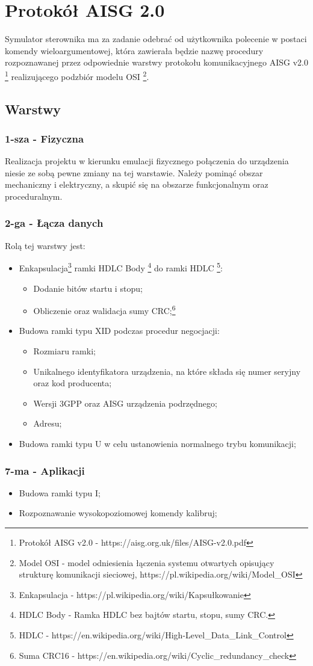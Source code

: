 \chapter{Protokół AISG 2.0}
	Symulator sterownika ma za zadanie odebrać od użytkownika polecenie w postaci komendy wieloargumentowej, 
	która zawierała będzie nazwę procedury rozpoznawanej przez odpowiednie warstwy protokołu komunikacyjnego AISG v2.0
	\footnote{\label{AISG} Protokół AISG v2.0 - https://aisg.org.uk/files/AISG-v2.0.pdf} realizującego podzbiór modelu OSI
	\footnote{\label{Model OSI} Model OSI - model odniesienia łączenia systemu otwartych opisujący strukturę komunikacji sieciowej, https://pl.wikipedia.org/wiki/Model\_OSI}. %
	\section{Warstwy}
		\subsection{1-sza - Fizyczna}
		Realizacja projektu w kierunku emulacji fizycznego połączenia do urządzenia niesie ze sobą pewne zmiany na tej warstawie.\newline
		Należy pominąć obszar mechaniczny i elektryczny, a skupić się na obszarze funkcjonalnym oraz proceduralnym.
		\subsection{2-ga - Łącza danych}
		Rolą tej warstwy jest:
		\begin{itemize}
			\item Enkapsulacja\footnote{\label{Enkapsulacja} Enkapsulacja - https://pl.wikipedia.org/wiki/Kapsułkowanie} ramki HDLC Body %
			\footnote{\label{HDLC Body} HDLC Body - Ramka HDLC bez bajtów startu, stopu, sumy CRC.} do ramki HDLC
			\footnote{\label{HDLC} HDLC - https://en.wikipedia.org/wiki/High-Level\_Data\_Link\_Control}: %
			\begin{itemize}
				\item Dodanie bitów startu i stopu;
				\item Obliczenie oraz walidacja sumy CRC;\footnote{\label{CRC} Suma CRC16 - https://en.wikipedia.org/wiki/Cyclic\_redundancy\_check} %
			\end{itemize}
			\item Budowa ramki typu XID podczas procedur negocjacji:
			\begin{itemize}
				\item Rozmiaru ramki;
				\item Unikalnego identyfikatora urządzenia, na które składa się numer seryjny oraz kod producenta;
				\item Wersji 3GPP oraz AISG urządzenia podrzędnego;
				\item Adresu;
			\end{itemize}
			\item Budowa ramki typu U w celu ustanowienia normalnego trybu komunikacji;
		\end{itemize}
		\subsection{7-ma - Aplikacji}
			\begin{itemize}
				\item Budowa ramki typu I;
				\item Rozpoznawanie wysokopoziomowej komendy kalibruj;
			\end{itemize}
